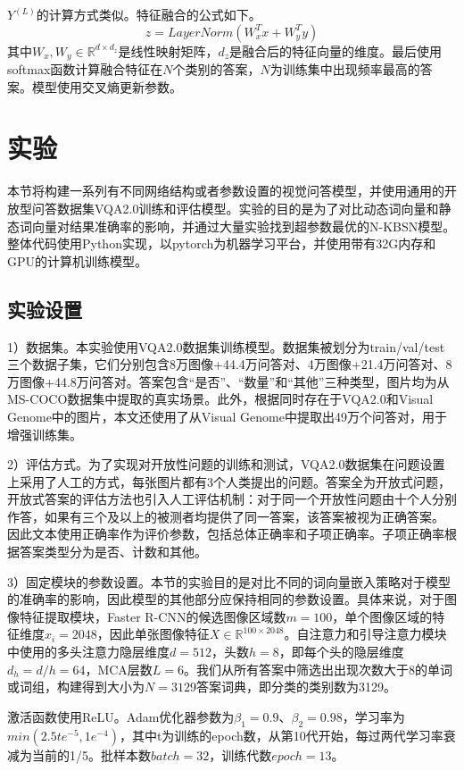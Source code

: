 $Y^{(L)}$的计算方式类似。特征融合的公式如下。
\begin{equation}
z = LayerNorm(W_x^Tx + W_y^Ty)
\end{equation}
其中$W_x, W_y \in \mathbb{R}^{d \times d_z}$是线性映射矩阵，$d_z$是融合后的特征向量的维度。最后使用softmax函数计算融合特征在$N$个类别的答案，$N$为训练集中出现频率最高的答案。模型使用交叉熵更新参数。

\section{实验}
本节将构建一系列有不同网络结构或者参数设置的视觉问答模型，并使用通用的开放型问答数据集VQA2.0训练和评估模型。实验的目的是为了对比动态词向量和静态词向量对结果准确率的影响，并通过大量实验找到超参数最优的N-KBSN模型。整体代码使用Python实现，以pytorch为机器学习平台，并使用带有32G内存和GPU的计算机训练模型。

\subsection{实验设置}
1）数据集。本实验使用VQA2.0数据集训练模型。数据集被划分为train/val/test三个数据子集，它们分别包含8万图像+44.4万问答对、4万图像+21.4万问答对、8万图像+44.8万问答对。答案包含“是否”、“数量”和“其他”三种类型，图片均为从MS-COCO数据集中提取的真实场景。此外，根据同时存在于VQA2.0和Visual Genome中的图片，本文还使用了从Visual Genome中提取出49万个问答对，用于增强训练集。

2）评估方式。为了实现对开放性问题的训练和测试，VQA2.0数据集在问题设置上采用了人工的方式，每张图片都有3个人类提出的问题。答案全为开放式问题，开放式答案的评估方法也引入人工评估机制：对于同一个开放性问题由十个人分别作答，如果有三个及以上的被测者均提供了同一答案，该答案被视为正确答案。
因此文本使用正确率作为评价参数，包括总体正确率和子项正确率。子项正确率根据答案类型分为是否、计数和其他。

3）固定模块的参数设置。本节的实验目的是对比不同的词向量嵌入策略对于模型的准确率的影响，因此模型的其他部分应保持相同的参数设置。具体来说，对于图像特征提取模块，Faster R-CNN的候选图像区域数$m = 100$，单个图像区域的特征维度$x_i = 2048$，因此单张图像特征$X \in \mathbb{R}^{100 \times 2048}$。自注意力和引导注意力模块中使用的多头注意力隐层维度$d=512$，头数$h=8$，即每个头的隐层维度$d_h=d/h=64$，MCA层数$L=6$。我们从所有答案中筛选出出现次数大于8的单词或词组，构建得到大小为$N=3129$答案词典，即分类的类别数为3129。

激活函数使用ReLU。Adam优化器参数为$\beta_1=0.9$、$\beta_2=0.98$，学习率为$min(2.5te^{-5}, 1e^{-4})$，其中t为训练的epoch数，从第10代开始，每过两代学习率衰减为当前的1/5。批样本数$batch = 32$，训练代数$epoch=13$。

